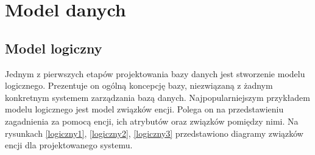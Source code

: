 \chapter{Model danych}
\label{chap5}

\section[Model logiczny][Model logiczny]{Model logiczny}
Jednym z pierwszych etapów projektowania bazy danych jest stworzenie modelu logicznego. Prezentuje on ogólną koncepcję bazy, niezwiązaną z żadnym konkretnym systemem zarządzania bazą danych. Najpopularniejszym przykładem modelu logicznego jest model związków encji. Polega on na przedstawieniu zagadnienia za pomocą encji, ich atrybutów oraz związków pomiędzy nimi. Na rysunkach \ref{logiczny1}, \ref{logiczny2}, \ref{logiczny3} przedstawiono diagramy związków encji dla projektowanego systemu.

